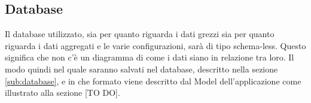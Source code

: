 %


\subsection{Database} %
\label{sec:database}
Il database utilizzato, sia per quanto riguarda i dati grezzi sia per quanto riguarda i dati aggregati e le varie configurazioni, sarà di tipo schema-less. Questo significa che non c'è un diagramma di come i dati siano in relazione tra loro. \newline
Il modo quindi nel quale saranno salvati nel database, descritto nella sezione \ref{sub:database}, e in che formato viene descritto dal Model dell'applicazione come illustrato alla sezione [TO DO]. \newline

